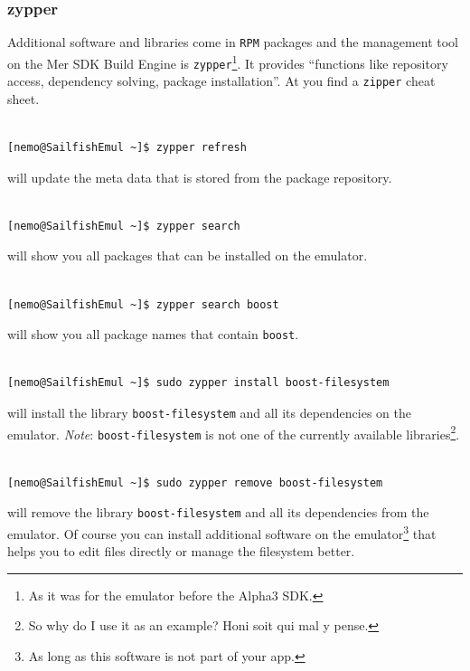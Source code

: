 \subsubsection{zypper}\label{subsubsec:zypper}
%
Additional software and libraries come in \verb,RPM, packages and the management tool on the Mer SDK Build Engine is \verb,zypper,\footnote{As it was for the emulator before the Alpha3 SDK.}. It provides ``functions like repository access, dependency solving, package installation''\cite{suse01}. At \cite{suse02} you find a \verb,zipper, cheat sheet.\\
\\
%
\begin{lstlisting}[language=bash]
[nemo@SailfishEmul ~]$ zypper refresh
\end{lstlisting}
will update the meta data that is stored from the package repository.
%
\\
\\
%
\begin{lstlisting}[language=bash]
[nemo@SailfishEmul ~]$ zypper search
\end{lstlisting}
will show you all packages that can be installed on the emulator.
%
\\
\\
\begin{lstlisting}[language=bash]
[nemo@SailfishEmul ~]$ zypper search boost
\end{lstlisting}
will show you all package names that contain \verb,boost,.
%
\\
\\
\begin{lstlisting}[language=bash]
[nemo@SailfishEmul ~]$ sudo zypper install boost-filesystem
\end{lstlisting}
will install the library \verb,boost-filesystem, and all its dependencies on the emulator. \emph{Note}: \verb,boost-filesystem, is not one of the currently available libraries\footnote{So why do I use it as an example? Honi soit qui mal y pense.}.
%
\\
\\
\begin{lstlisting}[language=bash]
[nemo@SailfishEmul ~]$ sudo zypper remove boost-filesystem
\end{lstlisting}
will remove the library \verb,boost-filesystem, and all its dependencies from the emulator.
Of course you can install additional software on the emulator\footnote{As long as this software is not part of your app.} that helps you to edit files directly or manage the filesystem better. 
%
